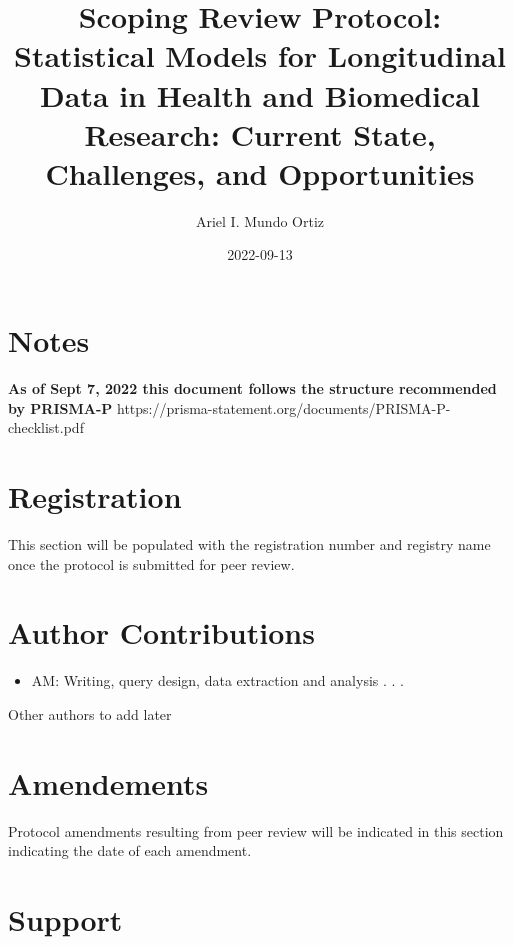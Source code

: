 \documentclass[
]{article}
\title{Scoping Review Protocol: Statistical Models for Longitudinal Data
in Health and Biomedical Research: Current State, Challenges, and
Opportunities}
\author{Ariel I. Mundo Ortiz}
\date{2022-09-13}
\providecommand{\tightlist}{%
  \setlength{\itemsep}{0pt}\setlength{\parskip}{0pt}}\usepackage{longtable,booktabs,array}
\renewcommand*\contentsname{Table of contents}
\newcommand\contentsname{Table of contents}
\begin{document}
\maketitle
\ifdefined\Shaded\renewenvironment{Shaded}{\begin{tcolorbox}[breakable, enhanced, sharp corners, borderline west={3pt}{0pt}{shadecolor}, frame hidden, boxrule=0pt, interior hidden]}{\end{tcolorbox}}\fi

\renewcommand*\contentsname{Table of contents}
{
\hypersetup{linkcolor=}
\setcounter{tocdepth}{3}
\tableofcontents
}
\hypertarget{notes}{%
\section{Notes}\label{notes}}

\textbf{As of Sept 7, 2022 this document follows the structure
recommended by PRISMA-P}
https://prisma-statement.org/documents/PRISMA-P-checklist.pdf

\hypertarget{registration}{%
\section{Registration}\label{registration}}

This section will be populated with the registration number and registry
name once the protocol is submitted for peer review.

\hypertarget{author-contributions}{%
\section{Author Contributions}\label{author-contributions}}

\begin{itemize}
\tightlist
\item
  AM: Writing, query design, data extraction and analysis . . .
\end{itemize}

Other authors to add later

\hypertarget{amendements}{%
\section{Amendements}\label{amendements}}

Protocol amendments resulting from peer review will be indicated in this
section indicating the date of each amendment.

\hypertarget{support}{%
\section{Support}\label{support}}
\end{document}
